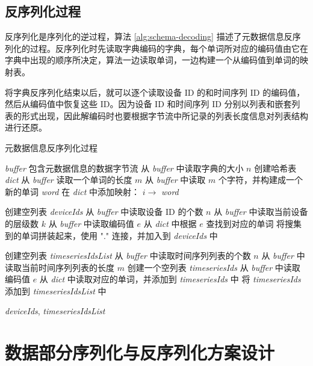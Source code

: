 \subsection{反序列化过程}
反序列化是序列化的逆过程，算法 \ref{alg:schema-decoding} 描述了元数据信息反序列化的过程。反序列化时先读取字典编码的字典，每个单词所对应的编码值由它在字典中出现的顺序所决定，算法一边读取单词，一边构建一个从编码值到单词的映射表。

将字典反序列化结束以后，就可以逐个读取设备 ID 的和时间序列 ID 的编码值，然后从编码值中恢复这些 ID。因为设备 ID 和时间序列 ID 分别以列表和嵌套列表的形式出现，因此解编码时也要根据字节流中所记录的列表长度信息对列表结构进行还原。


\begin{algorithm}
  \caption{元数据信息反序列化过程}
  \label{alg:schema-decoding}
  \small
  \begin{algorithmic}
    \REQUIRE \emph{buffer} 包含元数据信息的数据字节流
    \STATE 从 \emph{buffer} 中读取字典的大小 $n$
    \STATE 创建哈希表 \emph{dict}
      \STATE 从 \emph{buffer} 读取一个单词的长度 $m$
      \STATE 从 \emph{buffer} 中读取 $m$ 个字符，并构建成一个新的单词 \emph{word}
      \STATE 在 \emph{dict} 中添加映射： $i \rightarrow $ \emph{word}
    \ENDFOR

    \STATE 创建空列表 \emph{deviceIds}
    \STATE 从 \emph{buffer} 中读取设备 ID 的个数 $n$
      \STATE 从 \emph{buffer} 中读取当前设备的层级数 $k$
        \STATE 从 \emph{buffer} 中读取编码值 $e$
        \STATE 从 \emph{dict} 中根据 $e$ 查找到对应的单词
      \ENDFOR
      \STATE 将搜集到的单词拼装起来，使用 "." 连接，并加入到 \emph{deviceIds} 中
    \ENDFOR

    \STATE 创建空列表 \emph{timeseriesIdsList}
    \STATE 从 \emph{buffer} 中读取时间序列列表的个数 $n$
      \STATE 从 \emph{buffer} 中读取当前时间序列列表的长度 $m$
      \STATE 创建一个空列表 \emph{timeseriesIds}
        \STATE 从 \emph{buffer} 中读取编码值 $e$
        \STATE 从 \emph{dict} 中读取对应的单词，并添加到 \emph{timeseriesIds} 中
      \ENDFOR
      \STATE 将 \emph{timeseriesIds} 添加到 \emph{timeseriesIdsList} 中
    \ENDFOR

    \RETURN \emph{deviceIds}, \emph{timeseriesIdsList}

  \end{algorithmic}
\end{algorithm}


\section{数据部分序列化与反序列化方案设计}

